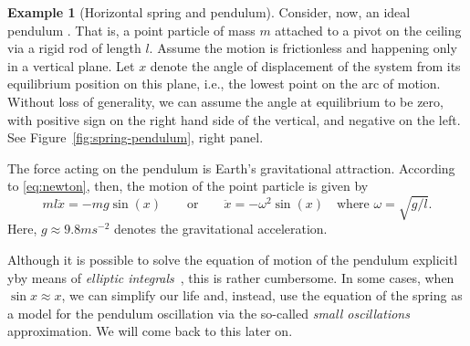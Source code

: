 \documentclass[english,fontsize=11pt,paper=b5]{scrbook}
\theoremstyle{definition}
\newtheorem{example}{Example}[chapter]
\newcommand{\emphidx}[1]{\index{#1}\emph{#1}}
\begin{document}
\begin{example}[Horizontal spring and pendulum]
    Consider, now, an ideal pendulum . That is, a point particle of mass $m$ attached to a pivot on the ceiling via a rigid rod of length $l$.
    Assume the motion is frictionless and happening only in a vertical plane.
    Let $x$ denote the angle of displacement of the system from its equilibrium position on this plane, i.e., the lowest point on the arc of motion.
    Without loss of generality, we can assume the angle at equilibrium to be zero, with positive sign on the right hand side of the vertical, and negative on the left. See Figure~\ref{fig:spring-pendulum}, right panel.

    The force acting on the pendulum is Earth's gravitational attraction.
    According to \eqref{eq:newton}, then, the motion of the point particle is given by
    \begin{equation}
      m l \ddot{x} = - m g \sin(x) \qquad\mbox{or}\qquad \ddot{x} = - \omega^2 \sin(x) \quad\mbox{where } \omega = \sqrt{g/l}.
    \end{equation}
    Here, $g \approx 9.8 m s^{-2}$ denotes the gravitational acceleration.

    Although it is possible to solve the equation of motion of the pendulum explicitl yby means of \emphidx{elliptic integrals}~\cite{elliptic}, this is rather cumbersome.
    In some cases, when $\sin x \approx x$, we can simplify our life and, instead, use the equation of the spring as a model for the pendulum oscillation via the so-called \emph{small oscillations} approximation.
    We will come back to this later on.
  \end{example}
\end{document}
